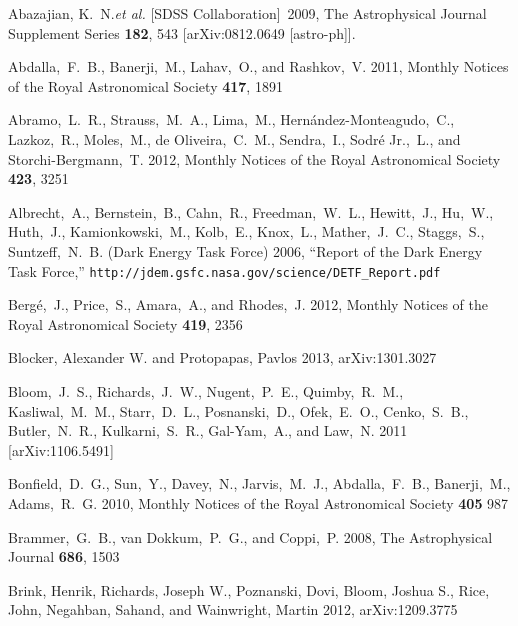 \documentclass[useAMS,usenatbib,tightenlines,11pt,preprint]{aastex}
\begin{document}
\begin{thebibliography}{99}

  Abazajian, K.~N.{\it et al.}  [SDSS Collaboration]~2009,
  The Astrophysical Journal Supplement Series  {\bf 182}, 543
  [arXiv:0812.0649 [astro-ph]].

Abdalla,~F.~B., Banerji,~M., Lahav,~O., and Rashkov,~V. 2011,
Monthly Notices of the Royal Astronomical Society {\bf 417}, 1891

Abramo,~L.~R., Strauss,~M.~A., Lima,~M., Hern\'andez-Monteagudo,~C., Lazkoz,~R.,
Moles,~M., de Oliveira,~C.~M., Sendra,~I., Sodr\'e Jr.,~L., and
Storchi-Bergmann,~T. 2012, Monthly Notices of the Royal Astronomical Society
{\bf 423}, 3251

Albrecht,~A., Bernstein,~B., Cahn,~R., Freedman,~W.~L., Hewitt,~J.,
Hu,~W., Huth,~J., Kamionkowski,~M., Kolb,~E., Knox,~L., Mather,~J.~C.,
Staggs,~S., Suntzeff,~N.~B. (Dark Energy Task Force) 2006,
``Report of the Dark Energy Task Force,''
\verb|http://jdem.gsfc.nasa.gov/science/DETF_Report.pdf|


Berg\'e,~J., Price,~S., Amara,~A., and Rhodes,~J. 2012,
Monthly Notices of the Royal Astronomical Society {\bf 419}, 2356

Blocker, Alexander W. and Protopapas, Pavlos 2013, arXiv:1301.3027

Bloom,~J.~S., Richards,~J.~W., Nugent,~P.~E., Quimby,~R.~M., Kasliwal,~M.~M.,
Starr,~D.~L., Posnanski,~D., Ofek,~E.~O., Cenko,~S.~B., Butler,~N.~R.,
Kulkarni,~S.~R., Gal-Yam,~A., and Law,~N. 2011 [arXiv:1106.5491]

Bonfield,~D.~G., Sun,~Y., Davey,~N., Jarvis,~M.~J., Abdalla,~F.~B.,
Banerji,~M., Adams,~R.~G. 2010, Monthly Notices of the Royal Astronomical Society 
{\bf 405} 987

Brammer,~G.~B., van Dokkum,~P.~G., and Coppi,~P. 2008,
The Astrophysical Journal {\bf 686}, 1503

Brink, Henrik, Richards, Joseph W., Poznanski, Dovi, Bloom, Joshua S., Rice,
John, Negahban, Sahand, and Wainwright, Martin 2012, arXiv:1209.3775


\end{thebibliography}
\end{document}
